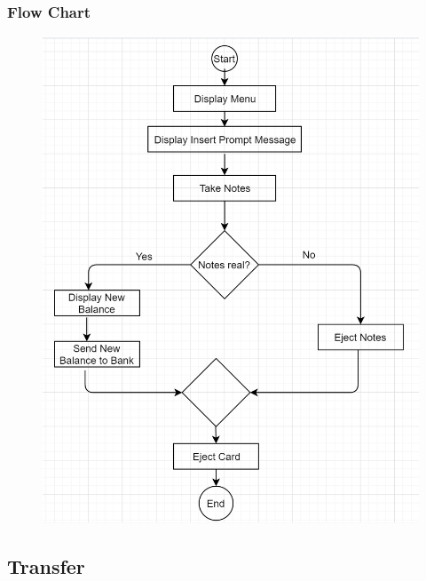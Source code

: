 \documentclass{article}
\begin{document}
		\newpage\subsubsection{Flow Chart}
		\begin{figure}[h!]
			\begin{center}
				\includegraphics[height=\linewidth]{img/deposit_flowchart.png}
			\end{center}
		\end{figure}
	\newpage\subsection{Transfer}
\end{document}
